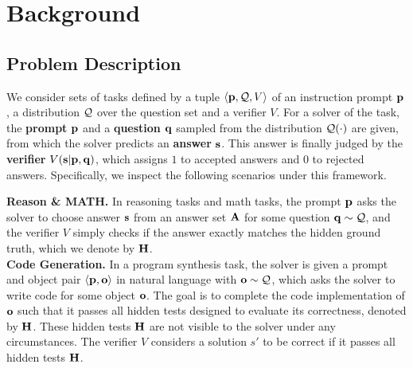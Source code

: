 \vspace{-0.2cm}
\section{Background}
\vspace{-0.1cm}
\label{sec:background}
\subsection{Problem Description}
\label{sec:background_problem}
We consider sets of tasks defined by a tuple $\langle \mathbf{p}, \mathcal{Q}, V \rangle$ of an instruction prompt $\mathbf{p}$, a distribution $\mathcal{Q}$ over the question set and a verifier $V$. For a solver of the task, the \textbf{prompt} $\mathbf{p}$ and a \textbf{question} $\mathbf{q}$ sampled from the distribution $\mathcal{Q}(\cdot)$ are given, from which the solver predicts an \textbf{answer} $\mathbf{s}$. This answer is finally judged by the \textbf{verifier} $V(\mathbf{s} | \mathbf{p}, \mathbf{q})$, which assigns $1$ to accepted answers and $0$ to rejected answers. Specifically, we inspect the following scenarios under this framework. 

\textbf{Reason \& MATH.} In reasoning tasks and math tasks, 
the prompt $\mathbf{p}$ asks the solver to choose answer $\mathbf{s}$ from an answer set $\mathbf{A}$ for some question $\mathbf{q} \sim \mathcal{Q}$, and the verifier $V$ simply checks if the answer exactly matches the hidden ground truth, which we denote by $\mathbf{H}$. 
\\
\textbf{Code Generation.} In a program synthesis task, the solver is given a prompt and object pair $\langle \mathbf{p},\mathbf{o} \rangle$ in natural language with $\mathbf{o} \sim \mathcal{Q}$, which asks the solver to write code for some object $\mathbf{o}$. The goal is to complete the code implementation of $\mathbf{o}$ such that it passes all hidden tests designed to evaluate its correctness, denoted by $\mathbf{H}$. These hidden tests $\mathbf{H}$ are not visible to the solver under any circumstances. The verifier $V$ considers a solution $s'$ to be correct if it passes all hidden tests $\mathbf{H}$. 

